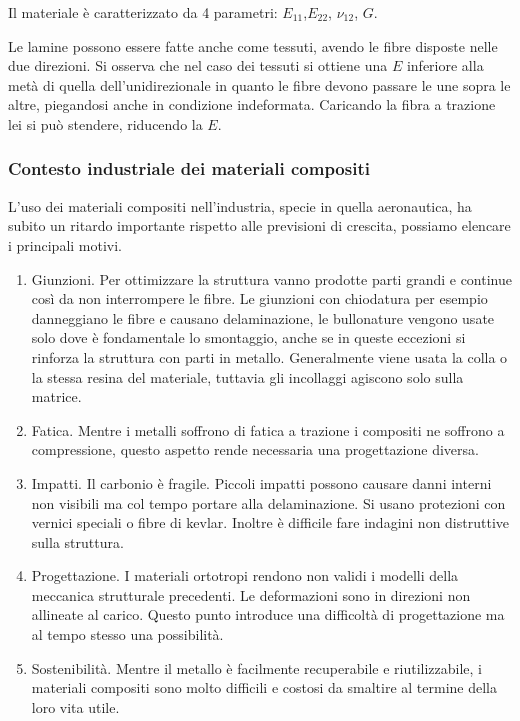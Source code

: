Il materiale è caratterizzato da 4 parametri:  $E_{11}$,$E_{22}$,  $\nu_{12}$,  $G$.

Le lamine possono essere fatte anche come tessuti, avendo le fibre disposte nelle due direzioni. Si osserva che nel caso dei tessuti si ottiene una $E$ inferiore alla metà di quella dell'unidirezionale in quanto le fibre devono passare le une sopra le altre, piegandosi anche in condizione indeformata. Caricando la fibra a trazione lei si può stendere, riducendo la $E$.

\subsubsection*{Contesto industriale dei materiali compositi}
L'uso dei materiali compositi nell'industria, specie in quella aeronautica, ha subito un ritardo importante rispetto alle previsioni di crescita, possiamo elencare i principali motivi.

\begin{enumerate}
    \item Giunzioni. Per ottimizzare la struttura vanno prodotte parti grandi e continue così da non interrompere le fibre. Le giunzioni con chiodatura per esempio danneggiano le fibre e causano delaminazione, le bullonature vengono usate solo dove è fondamentale lo smontaggio, anche se in queste eccezioni si rinforza la struttura con parti in metallo. Generalmente viene usata la colla o la stessa resina del materiale, tuttavia gli incollaggi agiscono solo sulla matrice.\\
    \item Fatica. Mentre i metalli soffrono di fatica a trazione i compositi ne soffrono a compressione, questo aspetto rende necessaria una progettazione diversa.\\
    \item Impatti. Il carbonio è fragile. Piccoli impatti possono causare danni interni non visibili ma col tempo portare alla delaminazione. Si usano protezioni con vernici speciali o fibre di kevlar. Inoltre è difficile fare indagini non distruttive sulla struttura.\\
    \item Progettazione. I materiali ortotropi rendono non validi i modelli della meccanica strutturale precedenti. Le deformazioni sono in direzioni non allineate al carico. Questo punto introduce una difficoltà di progettazione ma al tempo stesso una possibilità.\\
    \item Sostenibilità. Mentre il metallo è facilmente recuperabile e riutilizzabile, i materiali compositi sono molto difficili e costosi da smaltire al termine della loro vita utile.
\end{enumerate}

